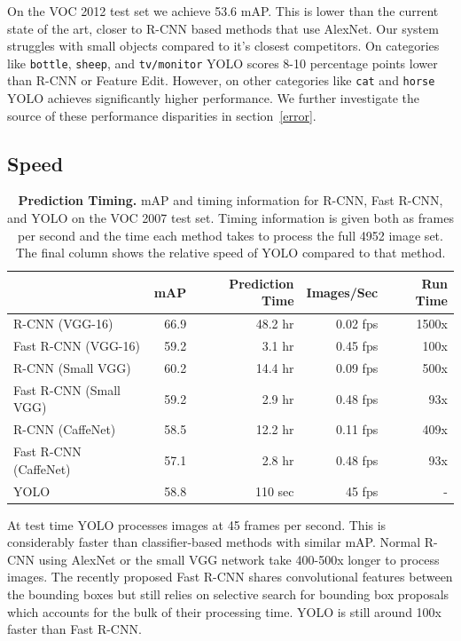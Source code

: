 \documentclass{article} %
\begin{document}
On the VOC 2012 test set we achieve 53.6 mAP. This is lower than the current state of the art, closer to R-CNN based methods that use AlexNet. Our system struggles with small objects compared to it's closest competitors. On categories like \texttt{bottle}, \texttt{sheep}, and \texttt{tv/monitor} YOLO scores 8-10 percentage points lower than R-CNN or Feature Edit. However, on other categories like \texttt{cat} and \texttt{horse} YOLO achieves significantly higher performance. We further investigate the source of these performance disparities in section~\ref{error}.

\subsection{Speed}

\begin{table}
\begin{center}
\begin{tabular}{lrrrr}
 & mAP & Prediction Time & Images/Sec & Run Time\\
\hline
R-CNN (VGG-16) & 66.9 & 48.2 hr & 0.02 fps & 1500x \\
Fast R-CNN (VGG-16) & 59.2 & 3.1 hr & 0.45 fps & 100x \\
R-CNN (Small VGG) & 60.2 & 14.4 hr & 0.09 fps & 500x \\
Fast R-CNN (Small VGG) & 59.2 & 2.9 hr & 0.48 fps & 93x \\
R-CNN (CaffeNet) & 58.5 & 12.2 hr & 0.11 fps & 409x \\
Fast R-CNN (CaffeNet) & 57.1 & 2.8 hr & 0.48 fps & 93x \\
YOLO & 58.8 & 110 sec & 45 fps & - \\
\end{tabular}
\end{center}
\caption{\textbf{Prediction Timing.} mAP and timing information for R-CNN, Fast R-CNN, and YOLO on the VOC 2007 test set. Timing information is given both as frames per second and the time each method takes to process the full 4952 image set. The final column shows the relative speed of YOLO compared to that method.}
\end{table}

At test time YOLO processes images at 45 frames per second. This is considerably faster than classifier-based methods with similar mAP. Normal R-CNN using AlexNet or the small VGG network take 400-500x longer to process images. The recently proposed Fast R-CNN shares convolutional features between the bounding boxes but still relies on selective search for bounding box proposals which accounts for the bulk of their processing time. YOLO is still around 100x faster than Fast R-CNN.
\end{document}
